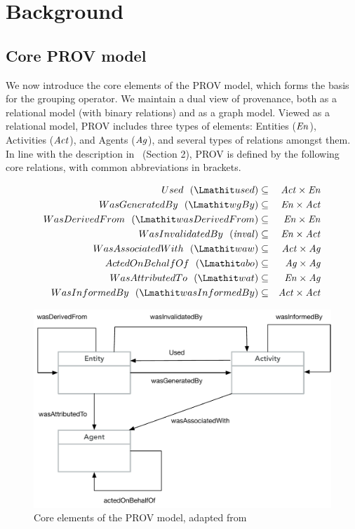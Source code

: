 
\section{Background}
\label{sec:prov-background}

\subsection{Core PROV model} \label{sec:prov-core}

We now introduce the core elements of the PROV model, which forms the basis for the grouping operator.
%
We maintain a dual view of provenance, both as a relational model (with binary relations) and as a graph model. Viewed as a relational model, PROV includes three types of elements: Entities ($\mathit{En}$), Activities ($\mathit{Act}$), and Agents ($\mathit{Ag}$), and several types of relations amongst them. 
In line with the description in~\citep{w3c-prov-dm} (Section 2), PROV is defined by the following core relations, with common abbreviations in brackets. 

\begin{eqnarray*}
Used~~(\used)  & \subseteq & \act \times \en \\
WasGeneratedBy~~(\wgby) & \subseteq  & \en \times \act \\
WasDerivedFrom~~(\wdf) & \subseteq   & \en \times \en \\
WasInvalidatedBy~~(\inv) &  \subseteq &  \en \times \act \\
WasAssociatedWith~~(\waw) & \subseteq & \act \times \ag \\
ActedOnBehalfOf~~(\delegate) & \subseteq & \ag \times \ag \\ 
WasAttributedTo~~(\attrTo) & \subseteq & \en \times \ag \\
WasInformedBy~~(\wasInfBy) & \subseteq & \act \times \act
\end{eqnarray*}


\begin{figure}
\centering
\includegraphics[scale=.45]{prov-essentials.pdf} 
\caption{Core elements of the PROV model, adapted from~\citep{w3c-prov-dm}}
\label{fig:prov-core}
\end{figure}

